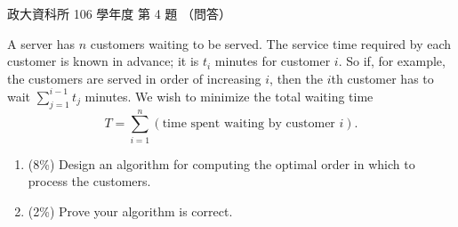 \begin{pastexam}[label={px:nccu-106-dsa-04}]{政大資科所 106 學年度 第 4 題}
（問答）

A server has $n$ customers waiting to be served. The service time required by each customer is
known in advance; it is $t_i$ minutes for customer $i$. So if, for example, the customers are
served in order of increasing $i$, then the $i$th customer has to wait $\sum_{j=1}^{i-1}t_j$
minutes. We wish to minimize the total waiting time
\[ T=\sum_{i=1}^{n}(\text{time spent waiting by customer } i). \]
\begin{enumerate}[label=\Alph*.]
\item (8\%) Design an algorithm for computing the optimal order in which to process the customers.
\item (2\%) Prove your algorithm is correct.
\end{enumerate}
\end{pastexam}

